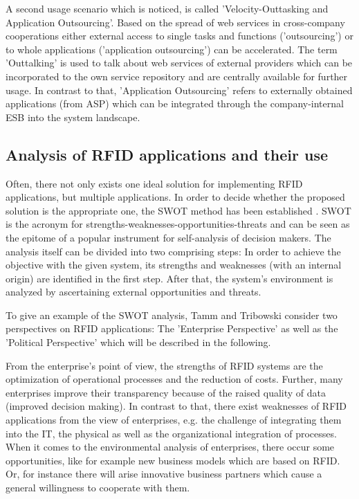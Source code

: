 A second usage scenario which is noticed, is called 'Velocity-Outtasking and Application Outsourcing'. Based on the spread of web services in cross-company cooperations either external access to single tasks and functions ('outsourcing') or to whole applications ('application outsourcing') can be accelerated. 
The term 'Outtalking' is used to talk about web services of external providers which can be incorporated to the own service repository and are centrally available for further usage. In contrast to that, 'Application Outsourcing' refers to externally obtained applications (from \ac{ASP}) which can be integrated through the company-internal ESB into the system landscape.

\subsection{Analysis of RFID applications and their use}

Often, there not only exists one ideal solution for implementing RFID applications, but multiple applications. In order to decide whether the proposed solution is the appropriate one, the \ac{SWOT} method has been established \cite[p.47 ff.]{fokus}. SWOT is the acronym for strengths-weaknesses-opportunities-threats and can be seen as the epitome of a popular instrument for self-analysis of decision makers. The analysis itself can be divided into two comprising steps: In order to achieve the objective with the given system, its strengths and weaknesses (with an internal origin) are identified in the first step. After that, the system's environment is analyzed by ascertaining external opportunities and threats. 

To give an example of the SWOT analysis, Tamm and Tribowski \cite[p.47 ff.]{fokus} consider two perspectives on RFID applications: The 'Enterprise Perspective' as well as the 'Political Perspective' which will be described in the following. 

From the enterprise's point of view, the strengths of RFID systems are the optimization of operational processes and the reduction of costs. Further, many enterprises improve their transparency because of the raised quality of data (improved decision making). In contrast to that, there exist weaknesses of RFID applications from the view of enterprises, e.g. the challenge of integrating them into the IT, the physical as well as the organizational integration of processes. When it comes to the environmental analysis of enterprises, there occur some opportunities, like for example new business models which are based on RFID. Or, for instance there will arise innovative business partners which cause a general willingness to cooperate with them. 

